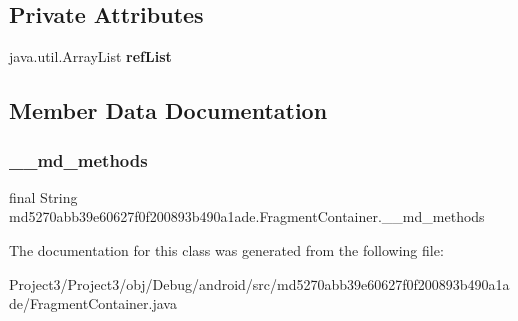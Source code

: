 \subsection*{Private Attributes}
\begin{DoxyCompactItemize}
\item 
\mbox{\label{classmd5270abb39e60627f0f200893b490a1ade_1_1FragmentContainer_ab86ceca75650914561141dfeda0cc8f3}} 
java.\+util.\+Array\+List {\bfseries ref\+List}
\end{DoxyCompactItemize}


\subsection{Member Data Documentation}
\mbox{\label{classmd5270abb39e60627f0f200893b490a1ade_1_1FragmentContainer_a5e152354be6320af362304f8c061ed9b}} 
\subsubsection{\texorpdfstring{\+\_\+\+\_\+md\+\_\+methods}{\_\_md\_methods}}
{\footnotesize\ttfamily final String md5270abb39e60627f0f200893b490a1ade.\+Fragment\+Container.\+\_\+\+\_\+md\+\_\+methods\hspace{0.3cm}{\ttfamily [static]}}



The documentation for this class was generated from the following file\+:\begin{DoxyCompactItemize}
\item 
Project3/\+Project3/obj/\+Debug/android/src/md5270abb39e60627f0f200893b490a1ade/Fragment\+Container.\+java\end{DoxyCompactItemize}
